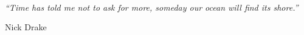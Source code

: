 \begin{epigrafe}
	\vspace*{\fill}
	\noindent
	\hangindent=5cm \\
 	\textit{``Time has told me not to ask for more,
  someday our ocean will find its shore.''}
 	\begin{flushright}
	Nick Drake
	\end{flushright}		
\end{epigrafe}